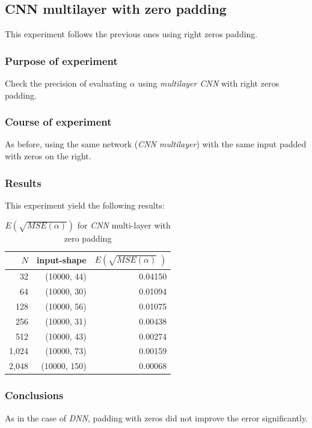 \documentclass[a4paper, 12pt]{report}
\begin{document}
\subsection{CNN multilayer with zero padding}
This experiment follows the previous ones using right zeros padding.

\subsubsection{Purpose of experiment}
Check the precision of evaluating $\alpha$ using \textit{multilayer CNN} with right zeros padding.

\subsubsection{Course of experiment}
As before, using the same network (\textit{CNN multilayer}) with the same input padded with zeros on the right. 

\subsubsection{Results}
This experiment yield the following results:
\begin{table}[h!]
    \centering
    \begin{tabular}{r r r} 
        $N$ & input-shape & $E\left(\sqrt{MSE(\alpha)}\;\right)$ \\
        \hline
        32 & (10000, 44) & 0.04150 \\ 
        64 & (10000, 30) & 0.01094 \\
        128 & (10000, 56) & 0.01075 \\
        256 & (10000, 31) & 0.00438 \\
        512 & (10000, 43) & 0.00274 \\ 
        1,024 & (10000, 73) & 0.00159 \\ 
        2,048 & (10000, 150) & 0.00068 \\ 
    \end{tabular}
    \caption{$E\left(\sqrt{MSE(\alpha)}\right)$ for \textit{CNN} multi-layer with zero padding}
    \label{table:cnn-multi-zeros-sqrt-mse}
\end{table}

\subsubsection{Conclusions}
As in the case of \textit{DNN}, padding with zeros did not improve the error significantly.
\end{document}
